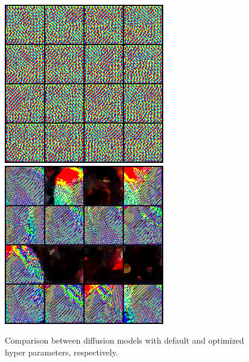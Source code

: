 \documentclass{article}
\begin{document}
\begin{figure}[tb]
    \includegraphics[width=0.5\linewidth]{images/generated_samples/diffusion_ffhq_default_epoch=464-train_loss=0.07.ckpt_final_images}
    \includegraphics[width=0.5\linewidth]{images/generated_samples/diffusion_ffhq_optim_solution4_short_epoch=484-train_loss=0.05.ckpt_final_images}
    \caption{Comparison between diffusion models with default and optimized hyper parameters, respectively.}
    \label{fig:diffusion}
\end{figure}
\end{document}
